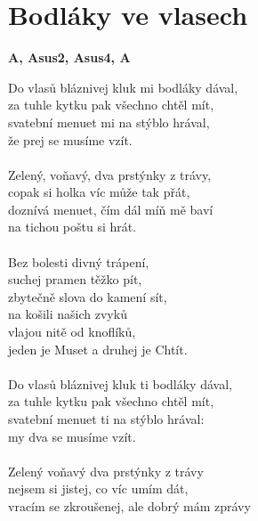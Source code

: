 \section{Bodláky ve vlasech}
\footnotesize\textbf{A, Asus2, Asus4, A}\\
\normalsize
\begin{multicols}{2}
Do vlasů bláznivej kluk mi bodláky dával,\\
za tuhle kytku pak všechno chtěl mít,\\
svatební menuet mi na stýblo hrával,\\
že prej se musíme vzít.\\
\\
Zelený, voňavý, dva prstýnky z trávy,\\
copak si holka víc může tak přát,\\
doznívá menuet, čím dál míň mě baví\\
na tichou poštu si hrát.\\
\\
Bez bolesti divný trápení,\\
suchej pramen těžko pít,\\
zbytečně slova do kamení sít,\\
na košili našich zvyků\\
vlajou nitě od knoflíků,\\
jeden je Muset a druhej je Chtít.\\
\columnbreak
\\
Do vlasů bláznivej kluk ti bodláky dával,\\
za tuhle kytku pak všechno chtěl mít,\\
svatební menuet ti na stýblo hrával:\\
my dva se musíme vzít.\\
\\
Zelený voňavý dva prstýnky z trávy\\
nejsem si jistej, co víc umím dát,\\
vracím se zkroušenej, ale dobrý mám zprávy\\

\end{multicols}
